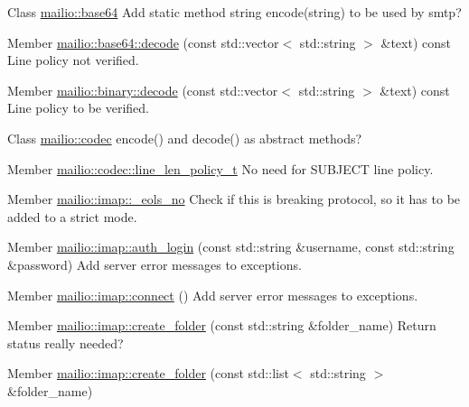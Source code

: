 
\begin{DoxyRefList}
\item[Class \mbox{\hyperlink{classmailio_1_1base64}{mailio::base64}} ]\label{todo__todo000001}%
%
Add static method {\ttfamily string encode(string)} to be used by {\ttfamily smtp}?  
\item[Member \mbox{\hyperlink{classmailio_1_1base64_abc9aaae74d8cd835b3154d126ab3c1d6}{mailio::base64::decode}} (const std\+::vector$<$ std\+::string $>$ \&text) const]\label{todo__todo000002}%
%
Line policy not verified. 
\item[Member \mbox{\hyperlink{classmailio_1_1binary_a5ce92613b14f14d17fccacf2a5d55d8a}{mailio::binary::decode}} (const std\+::vector$<$ std\+::string $>$ \&text) const]\label{todo__todo000003}%
%
Line policy to be verified. 
\item[Class \mbox{\hyperlink{classmailio_1_1codec}{mailio::codec}} ]\label{todo__todo000004}%
%
{\ttfamily encode()} and {\ttfamily decode()} as abstract methods?  
\item[Member \mbox{\hyperlink{classmailio_1_1codec_ad45f8f73b243a94ea3a5add21d66055e}{mailio::codec::line\+\_\+len\+\_\+policy\+\_\+t}} ]\label{todo__todo000005}%
%
No need for {\ttfamily S\+U\+B\+J\+E\+CT} line policy. 
\item[Member \mbox{\hyperlink{classmailio_1_1imap_a64ef2a9cbd8fcf1fe64b35641b881b23}{mailio::imap::\+\_\+eols\+\_\+no}} ]\label{todo__todo000028}%
%
Check if this is breaking protocol, so it has to be added to a strict mode. 
\item[Member \mbox{\hyperlink{classmailio_1_1imap_a49db87437dd17e1939ba7789e190e722}{mailio::imap::auth\+\_\+login}} (const std\+::string \&username, const std\+::string \&password)]\label{todo__todo000024}%
%
Add server error messages to exceptions. 
\item[Member \mbox{\hyperlink{classmailio_1_1imap_a500ee348338e6bcd6e03aed5a684e22e}{mailio::imap::connect}} ()]\label{todo__todo000023}%
%
Add server error messages to exceptions. 
\item[Member \mbox{\hyperlink{classmailio_1_1imap_ae1eaa1bda16c50d0ca6d96133d33ddea}{mailio::imap::create\+\_\+folder}} (const std\+::string \&folder\+\_\+name)]\label{todo__todo000017}%
%
Return status really needed? 
\item[Member \mbox{\hyperlink{classmailio_1_1imap_ad71de47b18934ba398466084152e1976}{mailio::imap::create\+\_\+folder}} (const std\+::list$<$ std\+::string $>$ \&folder\+\_\+name)]\label{todo__todo000018}%

\end{DoxyRefList}
